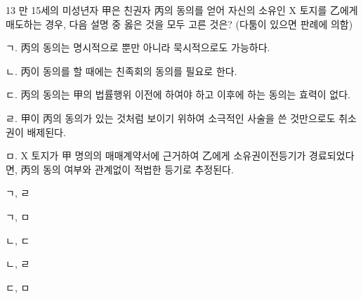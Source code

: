 \begin{question}{13}
만 15세의 미성년자 甲은 친권자 丙의 동의를 얻어 자신의 소유인 X 토지를 乙에게 매도하는 경우, 다음 설명 중 옳은 것을 모두 고른 것은? (다툼이 있으면 판례에 의함)
\begin{framedtext}
ㄱ. 丙의 동의는 명시적으로 뿐만 아니라 묵시적으로도 가능하다. \par
ㄴ. 丙이 동의를 할 때에는 친족회의 동의를 필요로 한다. \par
ㄷ. 丙의 동의는 甲의 법률행위 이전에 하여야 하고 이후에 하는 동의는 효력이 없다. \par
ㄹ. 甲이 丙의 동의가 있는 것처럼 보이기 위하여 소극적인 사술을 쓴 것만으로도 취소권이 배제된다. \par
ㅁ. X 토지가 甲 명의의 매매계약서에 근거하여 乙에게 소유권이전등기가 경료되었다면, 丙의 동의 여부와 관계없이 적법한 등기로 추정된다.
\end{framedtext}
\begin{choices}
  \item ㄱ, ㄹ
  \item ㄱ, ㅁ
  \item ㄴ, ㄷ
  \item ㄴ, ㄹ
  \item ㄷ, ㅁ
\end{choices}
\end{question}
